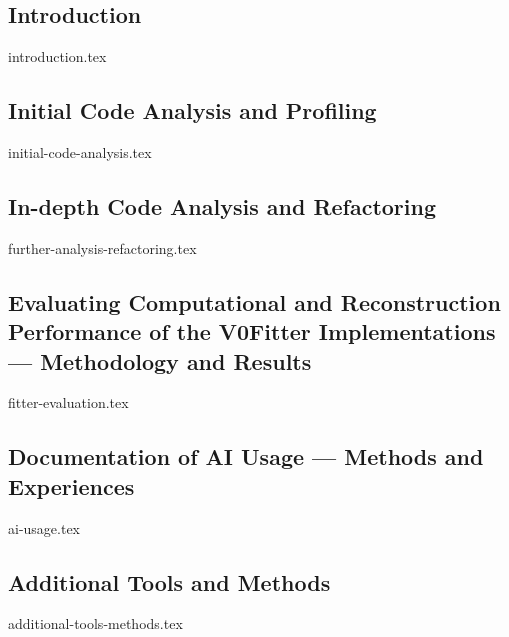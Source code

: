 \subsection{Introduction}
{introduction.tex}

\subsection{Initial Code Analysis and Profiling}
{initial-code-analysis.tex}

\subsection{In-depth Code Analysis and Refactoring}\label{sec:v0fitter-refactoring}
{further-analysis-refactoring.tex}

\subsection{Evaluating Computational and Reconstruction 
Performance of the V0Fitter Implementations --- Methodology and Results}
\label{sec:v0fitter-testing-methodology}
{fitter-evaluation.tex}

\subsection{Documentation of AI Usage --- Methods and Experiences}
{ai-usage.tex}

\subsection{Additional Tools and Methods}
{additional-tools-methods.tex}
